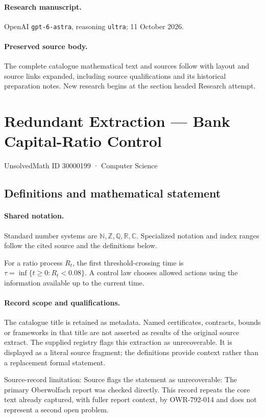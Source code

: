 \documentclass[11pt]{article}
\begin{document}
\paragraph{Research manuscript.} OpenAI \texttt{gpt-6-astra}, reasoning \texttt{ultra}; 11 October 2026.
\paragraph{Preserved source body.} The complete catalogue mathematical text and sources follow with layout and source links expanded, including source qualifications and its historical preparation notes. New research begins at the section headed Research attempt.

\section{Redundant Extraction — Bank Capital-Ratio Control}\label{30000199}
{\small UnsolvedMath ID 30000199 · Computer Science}
\subsection{Definitions and mathematical statement}

\paragraph{Shared notation.}Standard number systems are $\mathbb N,\mathbb Z,\mathbb Q,\mathbb R,\mathbb C$. Specialized notation and index ranges follow the cited source and the definitions below.


For a ratio process $R_t$, the first threshold-crossing time is $\tau=\inf\{t\geq0:R_t<0.08\}$. A control law chooses allowed actions using the information available up to the current time.
\paragraph{Record scope and qualifications.}
The catalogue title is retained as metadata. Named certificates, contracts, bounds or frameworks in that title are not asserted as results of the original source extract.
The supplied registry flags this extraction as unrecoverable. It is displayed as a literal source fragment; the definitions provide context rather than a replacement formal statement.

Source-record limitation: Source flags the statement as unrecoverable: The primary Oberwolfach report was checked directly. This record repeats the core text already captured, with fuller report context, by OWR-792-014 and does not represent a second open problem.
\end{document}
